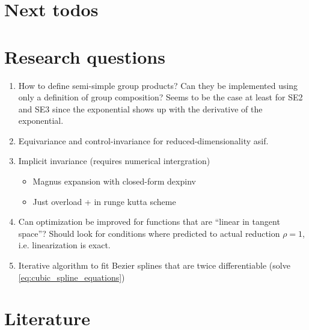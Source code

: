 

\section{Next todos}

\section{Research questions}

\begin{enumerate}
  \item How to define semi-simple group products? Can they be implemented using only a definition of group composition? Seems to be the case at least for SE2 and SE3 since the exponential shows up with the derivative of the exponential.
  \item Equivariance and control-invariance for reduced-dimensionality asif.
  \item Implicit invariance (requires numerical intergration)
  \begin{itemize}
      \item Magnus expansion with closed-form dexpinv
      \item Just overload + in runge kutta scheme
  \end{itemize}
  \item Can optimization be improved for functions that are ``linear in tangent space''? Should look for conditions where predicted to actual reduction $\rho = 1$, i.e. linearization is exact.
  \item Iterative algorithm to fit Bezier splines that are twice differentiable (solve \eqref{eq:cubic_spline_equations})
\end{enumerate}


\section{Literature}

